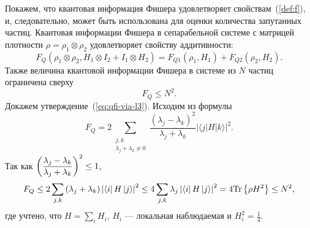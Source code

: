 Покажем, что квантовая информация Фишера удовлетворяет свойствам~(\ref{def:f}),
и, следовательно, может быть использована для оценки количества запутанных частиц.
Квантовая информации Фишера в сепарабельной системе с матрицей плотности $\rho = \rho_1 \otimes \rho_2$ удовлетворяет свойству аддитивности:
%
\begin{equation}\label{eq:qfi-via-l1}
  F_Q(\rho_1 \otimes \rho_2 ,H_1 \otimes I_2 + I_1 \otimes H_2) =
      F_{Q1} (\rho_1, H_1) + F_{Q2} (\rho_2 , H_2).
\end{equation}
%
Также величина квантовой информации Фишера в системе из $N$ частиц
ограничена сверху\:
%
\begin{equation}\label{eq:qfi-via-l3}
  F_Q \leq N^2.
\end{equation}
%
Докажем утверждение~(\ref{eq:qfi-via-l3}).
Исходим из формулы
%
\begin{equation}\label{eq:qfi-via-l4}
  F_Q = 2\sum_{\substack{j,k \\ \lambda_j + \lambda_k \neq 0}}
  \frac{(\lambda_j - \lambda_k)^2}{\lambda_j + \lambda_k}
  \left| \langle j|H|k \rangle \right|^2.
\end{equation}
%
Так как
$\left( \dfrac{\lambda_j - \lambda_k}{\lambda_j +\lambda_k} \right)^2 \leq 1$,
\begin{equation}
  F_Q \leq 2\sum_{j,k} \left( \lambda_j + \lambda_k \right) \left| \left\langle i \right| H \left| j \right\rangle \right|^2
  \leq 4\sum_{j,k} \lambda_j \left| \left\langle i \right| H \left| j \right\rangle \right|^2
  = 4 \mathrm{Tr} \left\{ \rho H^2 \right\}
  \leq N^2,
\end{equation}
где учтено, что $H = \sum_i H_i$,
$H_i$ --- локальная наблюдаемая и $H_i^2 = \frac 1 4$.

